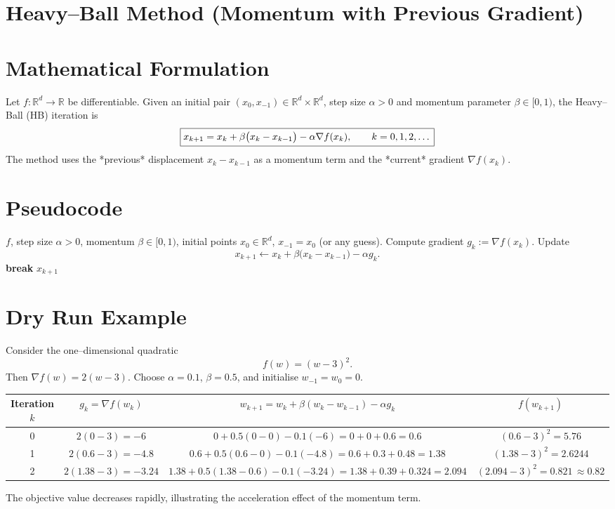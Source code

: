\documentclass{article}
\begin{document}
\section*{Heavy–Ball Method (Momentum with Previous Gradient)}

\section*{Mathematical Formulation}
Let $f:\mathbb{R}^d\to\mathbb{R}$ be differentiable.  
Given an initial pair $(x_0,x_{-1})\in\mathbb{R}^d\times\mathbb{R}^d$, step size $\alpha>0$ and momentum parameter $\beta\in[0,1)$, the Heavy–Ball (HB) iteration is
\begin{align}
\boxed{%
x_{k+1}=x_k+\beta\bigl(x_k-x_{k-1}\bigr)-\alpha\nabla f(x_k),\qquad k=0,1,2,\dots
}
\label{eq:HB}
\end{align}
The method uses the *previous* displacement $x_k-x_{k-1}$ as a momentum term and the *current* gradient $\nabla f(x_k)$.  

\section*{Pseudocode}
\begin{algorithm}[H]
\caption{Heavy–Ball Method}
\begin{algorithmic}[1]
\REQUIRE $f$, step size $\alpha>0$, momentum $\beta\in[0,1)$,
initial points $x_0\in\mathbb{R}^d$, $x_{-1}=x_0$ (or any guess).
    \STATE Compute gradient $g_k:=\nabla f(x_k)$.
    \STATE Update 
    \[
        x_{k+1}\gets x_k+\beta\bigl(x_k-x_{k-1}\bigr)-\alpha g_k .
    \]
        \STATE \textbf{break}
    \ENDIF
\ENDFOR
\RETURN $x_{k+1}$
\end{algorithmic}
\end{algorithm}

\section*{Dry Run Example}
Consider the one–dimensional quadratic
\[
f(w)=(w-3)^2 .
\]
Then $\nabla f(w)=2(w-3)$.  
Choose $\alpha=0.1$, $\beta=0.5$, and initialise $w_{-1}=w_0=0$.

\begin{center}
\begin{tabular}{c|c|c|c}
Iteration $k$ & $g_k=\nabla f(w_k)$ & $w_{k+1}=w_k+\beta(w_k-w_{k-1})-\alpha g_k$ & $f(w_{k+1})$\\\hline
0 & $2(0-3)=-6$ &
$0+0.5(0-0)-0.1(-6)=0+0+0.6=0.6$ &
$(0.6-3)^2=5.76$\\
1 & $2(0.6-3)=-4.8$ &
$0.6+0.5(0.6-0)-0.1(-4.8)=0.6+0.3+0.48=1.38$ &
$(1.38-3)^2=2.6244$\\
2 & $2(1.38-3)=-3.24$ &
$1.38+0.5(1.38-0.6)-0.1(-3.24)=1.38+0.39+0.324=2.094$ &
$(2.094-3)^2=0.821\,\approx0.82$
\end{tabular}
\end{center}
The objective value decreases rapidly, illustrating the acceleration effect of the momentum term.
\end{document}
